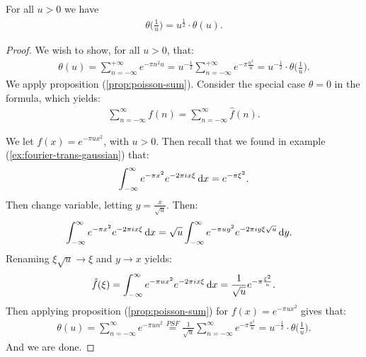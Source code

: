 \begin{proposition}\label{prop:theta-func-eq}
For all $u > 0$ we have
\begin{align*}
    \theta\big(\tfrac{1}{u}\big) = u^{\frac{1}{2}} \cdot \theta(u).
\end{align*}
\end{proposition}

\begin{proof}
We wish to show, for all $u>0$, that:
\begin{align*}
    \theta(u) = \sum_{n=-\infty}^{+\infty} e^{- \pi n^2 u} = u^{- \frac{1}{2}} \sum_{n=-\infty}^{+\infty} e^{- \pi \frac{n^2}{u}} = u^{- \frac{1}{2}} \cdot  \theta\big(\tfrac{1}{u}\big).
\end{align*}
We apply proposition (\ref{prop:poisson-sum}). Consider the special case $\theta = 0$ in the formula, which yields:
\begin{align*}
    \sum_{n=-\infty}^\infty f( n) = \sum_{n=-\infty}^\infty \hat{f}(n).
\end{align*}

We let $f(x) = e^{-\pi u x^2}$, with $u>0$. Then recall that we found in example (\ref{ex:fourier-trans-gaussian}) that:
\begin{align*}
    \int_{-\infty}^\infty e^{-\pi x^2} e^{-2\pi i x \xi}  \dif x = e^{-\pi \xi ^2 }.
\end{align*}
Then change variable, letting $y = \frac{x}{\sqrt{u}}$. Then:
\begin{align*}
    \int_{-\infty}^\infty e^{-\pi x^2} e^{-2\pi i x \xi}  \dif x &= \sqrt{u} \int_{-\infty}^\infty e^{-\pi u y^2} e^{-2\pi i y \xi \sqrt{u}}  \dif y.
\end{align*}
Renaming $\xi \sqrt{u} \xrightarrow{} \xi$ and $y \xrightarrow{} x$ yields:
\begin{align*}
    \hat{f}(\xi)=\int_{-\infty}^\infty e^{-\pi u x^2} e^{-2\pi i x \xi}  \dif x = \frac{1}{\sqrt{u}} e^{- \pi \frac{\xi^2}{u}}.
\end{align*}
Then applying proposition (\ref{prop:poisson-sum}) for $f(x) = e^{- \pi u x^2}$ gives that:
\begin{align*}
    \theta(u) = \sum_{n=-\infty}^\infty e^{- \pi u n^2} \overset{PSF}{=} \frac{1}{\sqrt{u} } \sum_{n=-\infty}^\infty e^{- \pi \frac{n^2}{u}} = u^{- \frac{1}{2}} \cdot  \theta\big(\tfrac{1}{u}\big).
\end{align*}
And we are done.

\end{proof}







